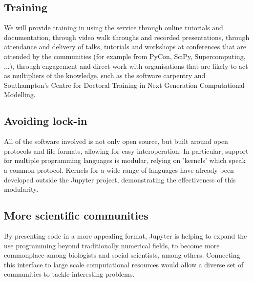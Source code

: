 
\subsection{Training}


We will provide training in using the service through online tutorials
and documentation, through video walk throughs and recorded
presentations, through attendance and delivery of talks, tutorials and
workshops at conferences that are attended by the communities (for
example from PyCon, SciPy, Supercomputing, ...), through engagement
and direct work with organisations that are likely to act as
multipliers of the knowledge, such as the software carpentry and
Southampton's Centre for Doctoral Training in Next Generation
Computational Modelling.



\subsection{Avoiding lock-in}

All of the software involved is not only open source, but built around open
protocols and file formats, allowing for easy interoperation. In particular,
support for multiple programming languages is modular, relying on 'kernels'
which speak a common protocol. Kernels for a wide range of languages have
already been developed outside the Jupyter project, demonstrating the
effectiveness of this modularity.


\subsection{More scientific communities}

By presenting code in a more appealing format, Jupyter is helping to expand
the use programming beyond traditionally numerical fields, to become more
commonplace among biologists and social scientists, among others. Connecting
this interface to large scale computational resources would allow a diverse set
of communities to tackle interesting problems.

